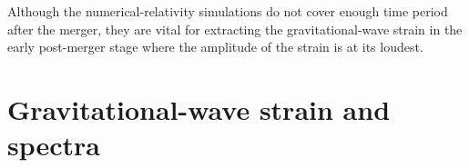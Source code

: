 \documentclass[../Thesis.tex]{subfiles}
\begin{document}
    Although the numerical-relativity simulations do not cover enough time period after the merger, they are vital for extracting the gravitational-wave strain in the early post-merger stage where the amplitude of the strain is at its loudest.
    

    

    
    

    




    \section{Gravitational-wave strain and spectra} \label{sec:Intro:StrainAndSpectra}
\end{document}

